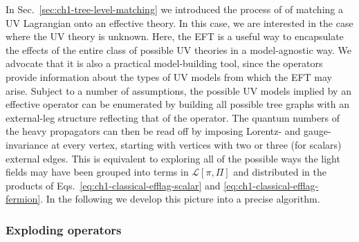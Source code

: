 In Sec.~\ref{sec:ch1-tree-level-matching} we introduced the process of of
matching a UV Lagrangian onto an effective theory. In this case, we are
interested in the case where the UV theory is unknown. Here, the EFT is a useful
way to encapsulate the effects of the entire class of possible UV theories in a
model-agnostic way. We advocate that it is also a practical model-building tool,
since the operators provide information about the types of UV models from which
the EFT may arise. Subject to a number of assumptions, the possible UV models
implied by an effective operator can be enumerated by building all possible tree
graphs with an external-leg structure reflecting that of the operator. The
quantum numbers of the heavy propagators can then be read off by imposing
Lorentz- and gauge-invariance at every vertex, starting with vertices with two
or three (for scalars) external edges. This is equivalent to exploring all of
the possible ways the light fields may have been grouped into terms in
$\mathscr{L}[\pi, \Pi]$ and distributed in the products of
Eqs.~\eqref{eq:ch1-classical-efflag-scalar} and
\eqref{eq:ch1-classical-efflag-fermion}. In the following we develop this
picture into a precise algorithm.

\subsubsection{Exploding operators}
\label{sec:ch2-exploding-operators}


